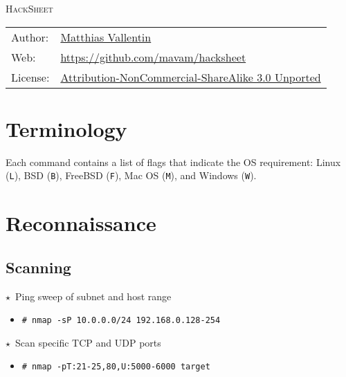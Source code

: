 \documentclass[10pt,landscape]{article}
\newcommand{\os}[1]{\texttt{\footnotesize{#1}}}
\newcommand{\freebsd}{\os{F}}
\newcommand{\bsd}{\os{B}}
\newcommand{\unix}{\os{U}}
\newcommand{\linux}{\os{L}}
\newcommand{\windows}{\os{W}}
\newcommand{\macos}{\os{M}}
\newenvironment{action}[1]
  {\begin{minipage}[c]{\linewidth}$\star$~#1\begin{itemize}[leftmargin=1cm]}
  {\end{itemize}\end{minipage}\vspace*{3pt}}
\newcommand{\cmd}[2]{\item[#1] {\small\tt\# #2}}
\begin{document}
\begin{multicols*}{3}

{\Huge\scshape
HackSheet\hspace{-2pt}\hspace{-4pt}
}


{\scriptsize
{}
\begin{tabular}{l l}
Author: & \href{http://matthias.vallentin.net}{Matthias Vallentin}\\
Web: & \url{https://github.com/mavam/hacksheet}\\
License: & \href{http://creativecommons.org/licenses/by-nc-sa/3.0/}
                {Attribution-NonCommercial-ShareAlike 3.0 Unported}
\end{tabular}
}


\vspace{-10pt}

\section*{Terminology}

Each command contains a list of flags that indicate the OS requirement: Linux
(\linux), BSD (\bsd), FreeBSD (\freebsd), Mac OS (\macos), and Windows
(\windows).

\section*{Reconnaissance}

\subsection*{Scanning}

\begin{action}{Ping sweep of subnet and host range}
\cmd{\unix}{nmap -sP 10.0.0.0/24 192.168.0.128-254}
\end{action}

\begin{action}{Scan specific TCP and UDP ports}
\cmd{\unix}{nmap -pT:21-25,80,U:5000-6000 target}
\end{action}


\end{multicols*}
\end{document}
